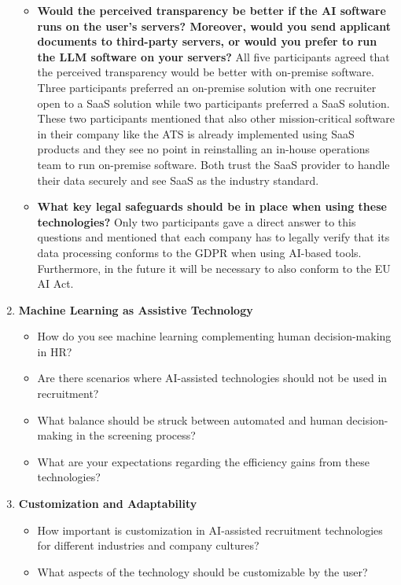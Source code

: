 \documentclass[draft,final]{thesisclass} %
\begin{document}
\begin{enumerate}
\begin{itemize}
        \item \textbf{Would the perceived transparency be better if the \acs{AI} software runs on the user's servers? Moreover, would you send applicant documents to third-party servers, or would you prefer to run the \acs{LLM} software on your servers?}
        All five participants agreed that the perceived transparency would be better with on-premise software. 
        Three participants preferred an on-premise solution with one recruiter open to a \acs{SaaS} solution while two participants preferred a \acs{SaaS} solution. 
        These two participants mentioned that also other mission-critical software in their company like the \acs{ATS} is already implemented using \acs{SaaS} products and they see no point in reinstalling an in-house operations team to run on-premise software.
        Both trust the \acs{SaaS} provider to handle their data securely and see \acs{SaaS} as the industry standard.
        \item \textbf{What key legal safeguards should be in place when using these technologies?}
        Only two participants gave a direct answer to this questions and mentioned that each company has to legally verify that its data processing conforms to the \acs{GDPR} when using \acs{AI}-based tools. Furthermore, in the future it will be necessary to also conform to the \acs{EU AI Act}.
    \end{itemize}
    \item \textbf{Machine Learning as Assistive Technology}
    \begin{itemize}
        \item How do you see machine learning complementing human decision-making in \acs{HR}?
        \item Are there scenarios where \acs{AI}-assisted technologies should not be used in recruitment?
        \item What balance should be struck between automated and human decision-making in the screening process?
        \item What are your expectations regarding the efficiency gains from these technologies?
    \end{itemize}
    \item \textbf{Customization and Adaptability}
    \begin{itemize}
        \item How important is customization in \acs{AI}-assisted recruitment technologies for different industries and company cultures?
        \item What aspects of the technology should be customizable by the user?

\end{itemize}
\end{enumerate}
\end{document}
